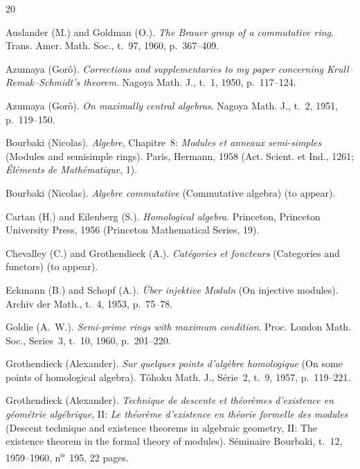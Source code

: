 %

\begin{thebibliography}{20}

Auslander (M.) and Goldman (O.). \emph{The Brauer group of a commutative
ring}. Trans. Amer. Math. Soc., t.~97, 1960, p.~367--409.

Azumaya (Gorô). \emph{Corrections and supplementaries to my paper concerning
Krull--Remak--Schmidt's theorem}. Nagoya Math. J., t.~1, 1950, p.~117--124.

Azumaya (Gorô). \emph{On maximally central algebras}. Nagoya Math. J., t.~2,
1951, p.~119--150.

Bourbaki (Nicolas). \emph{Algebre}, Chapitre~8: \emph{Modules et anneaux
semi-simples} (Modules and semisimple rings). Paris, Hermann, 1958
(Act. Scient. et Ind., 1261; \emph{Éléments de Mathématique}, 1).

Bourbaki (Nicolas). \emph{Algebre commutative} (Commutative algebra) (to
appear).

Cartan (H.) and Eilenberg (S.). \emph{Homological algebra}. Princeton,
Princeton University Press, 1956 (Princeton Mathematical Series, 19).

Chevalley (C.) and Grothendieck (A.). \emph{Catégories et foncteurs}
(Categories and functors) (to appear).

Eckmann (B.) and Schopf (A.). \emph{Über injektive Moduln} (On injective
modules). Archiv der Math., t.~4, 1953, p.~75--78.

Goldie (A.~W.). \emph{Semi-prime rings with maximum condition}. Proc. London
Math. Soc., Series~3, t.~10, 1960, p.~201--220.

Grothendieck (Alexander). \emph{Sur quelques points d'algèbre homologique}
(On some points of homological algebra). Tôhoku Math. J., Série~2, t.~9,
1957, p.~119--221.

Grothendieck (Alexander). \emph{Technique de descente et théorèmes
d'existence en géométrie algébrique}, II: \emph{Le théorème d'existence en
théorie formelle des modules} (Descent technique and existence theorems in
algebraic geometry, II: The existence theorem in the formal theory of
modules). Séminaire Bourbaki, t.~12, 1959--1960,
n\textsuperscript{o}~195, 22 pages.


\end{thebibliography}
